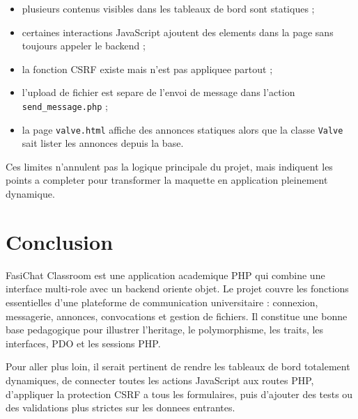 \documentclass[12pt,a4paper]{article}
\begin{document}
\begin{itemize}
    \item plusieurs contenus visibles dans les tableaux de bord sont statiques ;
    \item certaines interactions JavaScript ajoutent des elements dans la page sans toujours appeler le backend ;
    \item la fonction CSRF existe mais n'est pas appliquee partout ;
    \item l'upload de fichier est separe de l'envoi de message dans l'action \texttt{send\_message.php} ;
    \item la page \texttt{valve.html} affiche des annonces statiques alors que la classe \texttt{Valve} sait lister les annonces depuis la base.
\end{itemize}

Ces limites n'annulent pas la logique principale du projet, mais indiquent les points a completer pour transformer la maquette en application pleinement dynamique.

\section{Conclusion}

FasiChat Classroom est une application academique PHP qui combine une interface multi-role avec un backend oriente objet. Le projet couvre les fonctions essentielles d'une plateforme de communication universitaire : connexion, messagerie, annonces, convocations et gestion de fichiers. Il constitue une bonne base pedagogique pour illustrer l'heritage, le polymorphisme, les traits, les interfaces, PDO et les sessions PHP.

Pour aller plus loin, il serait pertinent de rendre les tableaux de bord totalement dynamiques, de connecter toutes les actions JavaScript aux routes PHP, d'appliquer la protection CSRF a tous les formulaires, puis d'ajouter des tests ou des validations plus strictes sur les donnees entrantes.
\end{document}
